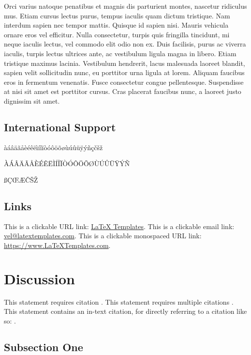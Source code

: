 \documentclass[
	a4paper, %
	10pt, %
	unnumberedsections, %
	twoside, %
]{LTJournalArticle}
\begin{document}
Orci varius natoque penatibus et magnis dis parturient montes, nascetur ridiculus mus. Etiam cursus lectus purus, tempus iaculis quam dictum tristique. Nam interdum sapien nec tempor mattis. Quisque id sapien nisi. Mauris vehicula ornare eros vel efficitur. Nulla consectetur, turpis quis fringilla tincidunt, mi neque iaculis lectus, vel commodo elit odio non ex. Duis facilisis, purus ac viverra iaculis, turpis lectus ultrices ante, ac vestibulum ligula magna in libero. Etiam tristique maximus lacinia. Vestibulum hendrerit, lacus malesuada laoreet blandit, sapien velit sollicitudin nunc, eu porttitor urna ligula at lorem. Aliquam faucibus eros in fermentum venenatis. Fusce consectetur congue pellentesque. Suspendisse at nisi sit amet est porttitor cursus. Cras placerat faucibus nunc, a laoreet justo dignissim sit amet.

\subsection{International Support}

\noindent àáâäãåèéêëìíîïòóôöõøùúûüÿýñçčšž

\noindent ÀÁÂÄÃÅÈÉÊËÌÍÎÏÒÓÔÖÕØÙÚÛÜŸÝÑ

\noindent ßÇŒÆČŠŽ

\subsection{Links}

This is a clickable URL link: \href{https://www.latextemplates.com}{LaTeX Templates}. This is a clickable email link: \href{mailto:vel@latextemplates.com}{vel@latextemplates.com}. This is a clickable monospaced URL link: \url{https://www.LaTeXTemplates.com}.


\section{Discussion}

This statement requires citation \autocite{Smith:2023qr}. This statement requires multiple citations \autocite{Smith:2023qr, Smith:2024jd}. This statement contains an in-text citation, for directly referring to a citation like so: \textcite{Smith:2024jd}.

\subsection{Subsection One}
\end{document}
